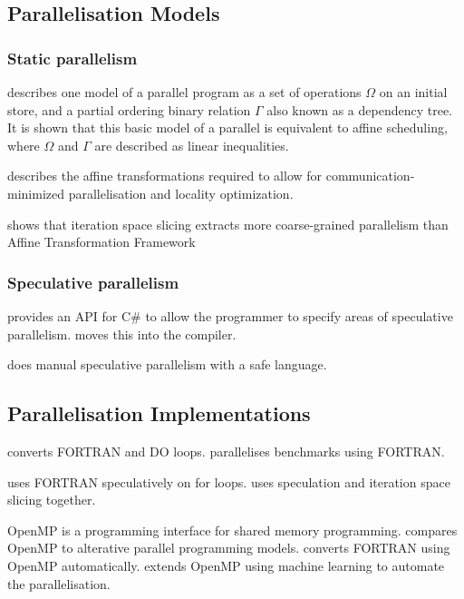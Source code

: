 \documentclass[conference]{IEEEtran}
\begin{document}
\subsection{Parallelisation Models}
\subsubsection{Static parallelism}
\textcite{Feautrier1992,Feautrier1992b} describes one model of a parallel program as a set of operations $\Omega$ on an initial store, and a partial ordering binary relation $\Gamma$ also known as a dependency tree. It is shown that this basic model of a parallel is equivalent to affine scheduling, where $\Omega$ and $\Gamma$ are described as linear inequalities.

\textcite{Bondhugula2008} describes the affine transformations required to allow for communication-minimized parallelisation and locality optimization.

\textcite{Beletska2011} shows that iteration space slicing extracts more coarse-grained parallelism than Affine Transformation Framework

\subsubsection{Speculative parallelism}
\textcite{Prabhu2010} provides an API for C\# to allow the programmer to specify areas of speculative parallelism.
\textcite{Yiapanis2015} moves this into the compiler.

\textcite{Prabhu2010} does manual speculative parallelism with a safe language.

\subsection{Parallelisation Implementations}
\textcite{DHollander1998} converts FORTRAN and DO loops.
\textcite{Eigenmann1998} parallelises benchmarks using FORTRAN.

\textcite{Rauchwerger1999} uses FORTRAN speculatively on for loops.
\textcite{Quinones2005} uses speculation and iteration space slicing together.

OpenMP is a programming interface for shared memory programming.
\textcite{Dagum1998} compares OpenMP to alterative parallel programming models.
\textcite{Kim2000} converts FORTRAN using OpenMP automatically.
\textcite{Lam2011} extends OpenMP using machine learning to automate the parallelisation.
\end{document}
